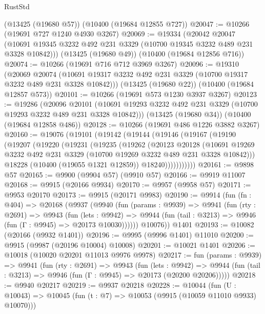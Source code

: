 \begin{lexlean}{RustStd}
\begin{coremodule}
    (@13425 (@19680 @57))
    (@10400 (@19684 @12855 @727))
@20047 := @10266 (@19691 @727 @1240 @4930 @3267)
@20069 := @19334
    (@20042
      @20047
      (@10691 @19345 @3232 @492 @231 @3329 (@10700 @19345 @3232 @489 @231 @3328 @10842)))
    (@13425 (@19680 @49))
    (@10400 (@19684 @12856 @716))
@20074 := @10266 (@19691 @716 @712 @3969 @3267)
@20096 := @19310
    (@20069
      @20074
      (@10691 @19317 @3232 @492 @231 @3329 (@10700 @19317 @3232 @489 @231 @3328 @10842)))
    (@13425 (@19680 @22))
    (@10400 (@19684 @12857 @573))
@20101 := @10266 (@19691 @573 @1230 @3937 @3267)
@20123 := @19286
    (@20096
      @20101
      (@10691 @19293 @3232 @492 @231 @3329 (@10700 @19293 @3232 @489 @231 @3328 @10842)))
    (@13425 (@19680 @34))
    (@10400 (@19684 @12858 @486))
@20128 := @10266 (@19691 @486 @1226 @3882 @3267)
@20160 := @19076
    (@19101
      (@19142
        (@19144
          (@19146
            (@19167
              (@19190
                (@19207
                  (@19220
                    (@19231
                      (@19235
                        (@19262
                          (@20123
                            @20128
                            (@10691
                              @19269
                              @3232
                              @492
                              @231
                              @3329
                              (@10700 @19269 @3232 @489 @231 @3328 @10842)))
                          @18228
                          (@10400 (@19055 @1321 @12859))
                          @18240)))))))))))
@20161 := @9898 @57
@20165 := @9900 (@9904 @57) (@9910 @57)
@20166 := @9919 @11007
@20168 := @9915 (@20166 @9934)
@20170 := @9957 (@9958 @57)
@20171 := @9953 @20170
@20173 := @9915 (@20171 @9983)
@20190 := @9914
    (fun (fn : @404) =>
    @20168
      (@9937
        (@9940
          (fun (params : @9939) =>
          @9941
            (fun (rty : @2691) =>
            @9943
              (fun (lets : @9942) =>
              @9944 (fun (tail : @3213) => @9946 (fun (Γ : @9945) => @20173 @10030))))))
        @10076))
    @1401
@20193 := @10082 (@20166 (@9932 @1401))
@20196 := @9995 (@9996 @1401) @11010
@20200 := @9915 (@9987 (@20196 @10004) @10008)
@20201 := @10021 @1401
@20206 := @10018 (@10020 @20201 @11013 @9976 @9978)
@20217 := fun (params : @9939) =>
  @9941
    (fun (rty : @2691) =>
    @9943
      (fun (lets : @9942) =>
      @9944 (fun (tail : @3213) => @9946 (fun (Γ : @9945) => @20173 (@20200 @20206)))))
@20218 := @9940 @20217
@20219 := @9937 @20218
@20228 := @10044
    (fun (U : @10043) => @10045 (fun (t : @7) => @10053 (@9915 (@10059 @11010 @9933) @10070)))

\end{coremodule}
\end{lexlean}
